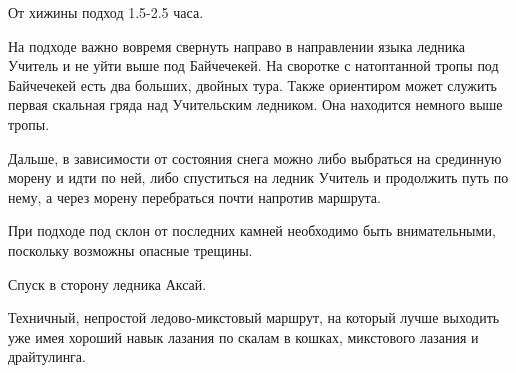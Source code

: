 От хижины \geoLighthouse{} подход 1.5-2.5 часа.

На подходе важно вовремя свернуть направо в направлении языка ледника Учитель и не уйти выше под Байчечекей. На своротке с натоптанной тропы
под Байчечекей есть два больших, двойных тура. Также ориентиром может служить первая скальная гряда над Учительским ледником. Она находится
немного выше тропы.

Дальше, в зависимости от состояния снега можно либо выбраться на срединную морену и идти по ней, либо спуститься на ледник Учитель и
продолжить путь по нему, а через морену перебраться почти напротив маршрута.

При подходе под склон от последних камней необходимо быть внимательными, поскольку возможны опасные трещины.



Спуск в сторону ледника Аксай.

Техничный, непростой ледово-микстовый маршрут, на который лучше выходить уже имея хороший навык лазания по скалам в кошках, микстового
лазания и драйтулинга.
